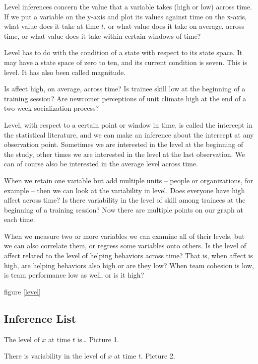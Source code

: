 \documentclass[english,,man]{apa6}
\theoremstyle{definition}
\theoremstyle{definition}
\theoremstyle{definition}
\theoremstyle{remark}
\begin{document}
Level inferences concern the value that a variable takes (high or low)
across time. If we put a variable on the y-axis and plot its values
against time on the x-axis, what value does it take at time \(t\), or
what value does it take on average, across time, or what value does it
take within certain windows of time?

Level has to do with the condition of a state with respect to its state
space. It may have a state space of zero to ten, and its current
condition is seven. This is level. It has also been called magnitude.

Is affect high, on average, across time? Is trainee skill low at the
beginning of a training session? Are newcomer perceptions of unit
climate high at the end of a two-week socialization process?

Level, with respect to a certain point or window in time, is called the
intercept in the statistical literature, and we can make an inference
about the intercept at any observation point. Sometimes we are
interested in the level at the beginning of the study, other times we
are interested in the level at the last observation. We can of course
also be interested in the average level across time.

When we retain one variable but add multiple units -- people or
organizations, for example -- then we can look at the variability in
level. Does everyone have high affect across time? Is there variability
in the level of skill among trainees at the beginning of a training
session? Now there are multiple points on our graph at each time.

When we measure two or more variables we can examine all of their
levels, but we can also correlate them, or regress some variables onto
others. Is the level of affect related to the level of helping behaviors
across time? That is, when affect is high, are helping behaviors also
high or are they low? When team cohesion is low, is team performance low
as well, or is it high?

figure \ref{level}

\hypertarget{inference-list}{%
\subsection{Inference List}\label{inference-list}}

The level of \(x\) at time \(t\) is\ldots{} Picture 1.

There is variability in the level of \(x\) at time \(t\). Picture 2.
\end{document}
